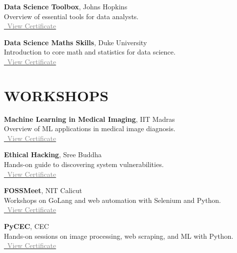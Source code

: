 \documentclass[11pt,a4paper]{article}
\begin{document}
\textbf{Data Science Toolbox}, Johns Hopkins \\
Overview of essential tools for data analysts. \\
\href{https://coursera.org/share/bd0023b71386ae9c7246bad3d5b566a7}{\faFilePdfO~\textcolor{gray}{View Certificate}}

\textbf{Data Science Maths Skills}, Duke University \\
Introduction to core math and statistics for data science. \\
\href{https://coursera.org/share/4bcf67532cd1ae69781e51db0bbb3445}{\faFilePdfO~\textcolor{gray}{View Certificate}}

\section*{WORKSHOPS}
\textbf{Machine Learning in Medical Imaging}, IIT Madras \\
Overview of ML applications in medical image diagnosis. \\
\href{https://jishnujp.github.io/certificates/mlmedic.jpg}{\faFilePdfO~\textcolor{gray}{View Certificate}}

\textbf{Ethical Hacking}, Sree Buddha \\
Hands-on guide to discovering system vulnerabilities. \\
\href{https://jishnujp.github.io/certificates/ethical_hacking.jpg}{\faFilePdfO~\textcolor{gray}{View Certificate}}

\textbf{FOSSMeet}, NIT Calicut \\
Workshops on GoLang and web automation with Selenium and Python. \\
\href{https://jishnujp.github.io/certificates/fossmeet.jpg}{\faFilePdfO~\textcolor{gray}{View Certificate}}

\textbf{PyCEC}, CEC \\
Hands-on sessions on image processing, web scraping, and ML with Python. \\
\href{https://jishnujp.github.io/certificates/pycec.jpg}{\faFilePdfO~\textcolor{gray}{View Certificate}}
\end{document}
